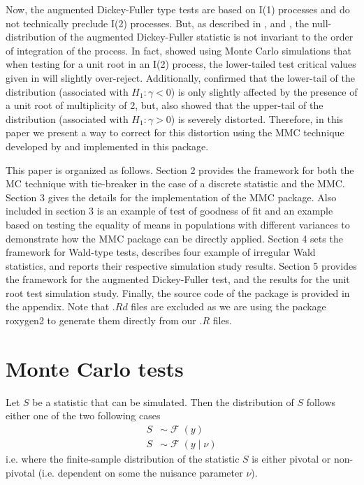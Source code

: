 \documentclass[]{article}\usepackage[]{graphicx}\usepackage[]{color}
\newcommand{\pkg}[1]{{\normalfont\fontseries{b}\selectfont #1}}
\DeclareMathOperator{\dist}{\mathcal{F}}
\begin{document}
Now, the augmented Dickey-Fuller type tests are based on I(1) processes and do not technically preclude I(2) processes. But, as described in \cite{david_a._dickey_determining_1987}, \cite{haldrup_robustness_2002} and \cite{pantula_testing_1989}, the null-distribution of the augmented Dickey-Fuller statistic is not invariant to the order of integration of the process. In fact, \cite{david_a._dickey_determining_1987} showed using Monte Carlo simulations that when testing for a unit root in an I(2) process, the lower-tailed test critical values given in \cite[Table 8.5.2]{fuller_introduction_1976} will slightly over-reject. Additionally,  \cite{haldrup_robustness_2002} confirmed that the lower-tail of the distribution (associated with $H_1: \gamma<0$) is only slightly affected by the presence of a unit root of multiplicity of 2, but, \cite{haldrup_robustness_2002} also showed that the upper-tail of the distribution (associated with $H_1: \gamma>0$) is severely distorted. Therefore, in this paper we present a way to correct for this distortion using the MMC technique developed by \cite{dufour_monte_2006} and implemented in this package.

This paper is organized as follows. Section 2 provides the framework for both the MC technique with tie-breaker in the case of a discrete statistic and the MMC. Section 3 gives the details for the implementation of the \pkg{MMC} package. Also included in section 3 is an example of test of goodness of fit and an example based on testing the equality of means in populations with different variances to demonstrate how the \pkg{MMC} package can be directly applied. Section 4 sets the framework for Wald-type tests, describes four example of irregular Wald statistics, and reports their respective simulation study results. Section 5 provides the framework for the augmented Dickey-Fuller test, and the results for the unit root test simulation study. Finally, the source code of the package is provided in the appendix. Note that $.Rd$ files are excluded as we are using the package \pkg{roxygen2} \citep{wickham_roxygen2:_2015} to generate them directly from our $.R$ files.

\section{Monte Carlo tests}

Let $S$ be a statistic that can be simulated. Then the distribution of $S$ follows either one of the two following cases
\begin{align}
S & \sim \dist(y) \\
S & \sim \dist(y \mid \nu)
\end{align}
i.e. where the finite-sample distribution of the statistic $S$ is either pivotal or non-pivotal (i.e. dependent on some the nuisance parameter $\nu$).
\end{document}
